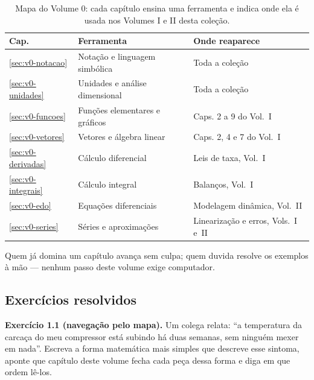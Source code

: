 \documentclass[12pt,a4paper]{article}
\numberwithin{equation}{section}
\numberwithin{table}{section}
\numberwithin{figure}{section}
\begin{document}
\begin{table}[H]
\centering
\caption[Mapa do Volume 0 e suas pontes com os volumes I e II.]{%
Mapa do Volume 0: cada capítulo ensina uma ferramenta e indica onde ela é
usada nos Volumes I e II desta coleção.}
\label{tab:v0-c1-1}
\begin{tabularx}{\textwidth}{lXl}
\toprule
\textbf{Cap.} & \textbf{Ferramenta} & \textbf{Onde reaparece} \\
\midrule
\ref{sec:v0-notacao} & Notação e linguagem simbólica & Toda a coleção \\
\ref{sec:v0-unidades} & Unidades e análise dimensional & Toda a coleção \\
\ref{sec:v0-funcoes} & Funções elementares e gráficos & Caps. 2 a 9 do Vol.~I \\
\ref{sec:v0-vetores} & Vetores e álgebra linear & Caps. 2, 4 e 7 do Vol.~I \\
\ref{sec:v0-derivadas} & Cálculo diferencial & Leis de taxa, Vol.~I \\
\ref{sec:v0-integrais} & Cálculo integral & Balanços, Vol.~I \\
\ref{sec:v0-edo} & Equações diferenciais & Modelagem dinâmica, Vol.~II \\
\ref{sec:v0-series} & Séries e aproximações & Linearização e erros, Vols.~I e~II \\
\bottomrule
\end{tabularx}
\end{table}

Quem já domina um capítulo avança sem culpa; quem duvida resolve os exemplos
à mão --- nenhum passo deste volume exige computador.

\subsection{Exercícios resolvidos}

\textbf{Exercício 1.1 (navegação pelo mapa).} Um colega relata: ``a
temperatura da carcaça do meu compressor está subindo há duas semanas, sem
ninguém mexer em nada''. Escreva a forma matemática mais simples que
descreve esse sintoma, aponte que capítulo deste volume fecha cada peça
dessa forma e diga em que ordem lê-los.
\end{document}
